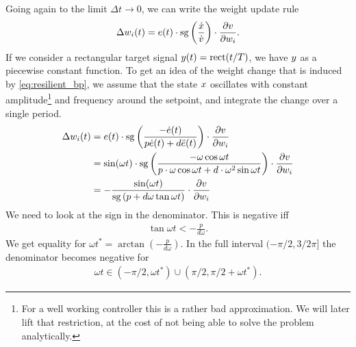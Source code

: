 \documentclass{article}
\begin{document}
    Going again to the limit $\Delta t \rightarrow 0$, we can write the weight update rule 
    \begin{align}
         \Delta w_i(t) = e(t) \cdot \operatorname{sg} \left(\frac{\dot{x}}{\dot{v}} \right) \cdot \frac{\partial v}{\partial w_i}.
         \label{eq:resilient_bp}
    \end{align}
    If we consider a rectangular target signal $y(t) = \mathrm{rect}(t/T)$, we have $y$ as a piecewise constant function. 
    To get an idea of the weight change that is induced by \eqref{eq:resilient_bp}, we assume that the state $x$ oscillates with constant amplitude\footnote{For a well working controller this is a rather bad approximation. We will later lift that restriction, at the cost of not being able to solve the problem analytically.} and frequency around the setpoint, and integrate the change over a single period.
    \begin{align}
         \Delta w_i(t) &= e(t) \cdot \operatorname{sg} \left( \frac{-\dot{e}(t)}{p \dot{e}(t) + d \ddot{e}(t)} \right)  \cdot \frac{\partial v}{\partial w_i} \label{eq:general_res_bp_wc}\\
         &= \sin(\omega t) \cdot  \mathrm{sg} \left(\frac{-\omega \cos{\omega t}}{p \cdot \omega \cos{\omega t} + d \cdot \omega^2 \sin{\omega t} } \right) \cdot \frac{\partial v}{\partial w_i} \nonumber \\
         &=-\frac{ \sin(\omega t) }{\mathrm{sg}\left(p + d \omega \tan{\omega t}\right) } \cdot \frac{\partial v}{\partial w_i}
    \end{align}
    We need to look at the sign in the denominator. This is negative iff
    \begin{align}
        \tan{\omega t} < -\frac{p}{d \omega}. \label{eq:sign_condition}
    \end{align}
    We get equality for $\omega t^* = \arctan \left(-\frac{p}{d \omega} \right)$. In the full interval $(-\pi/2, 3/2\pi]$ the denominator becomes negative for 
    \begin{align}
        \omega t \in (-\pi/2, \omega t^*) \cup (\pi/2, \pi/2+\omega t^*).
    \end{align}
\end{document}
